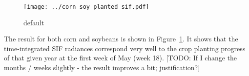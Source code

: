 \documentclass[review, a4paper, 10pt, times]{elsarticle}
\begin{document}
\begin{figure}[htbp]
\centering
\texttt{[image: ../corn\_soy\_planted\_sif.pdf]}
\caption{default}
\label{fig:corn_soy_planted_sif}
\end{figure}

The result for both corn and soybeans is shown in Figure~\ref{fig:corn_soy_planted_sif}. It shows that the time-integrated SIF radiances correspond very well to the crop planting progress of that given year at the first week of May (week 18). [TODO: If I change the months / weeks slightly - the result improves a bit; justification?]



\section*{}

\end{document}
